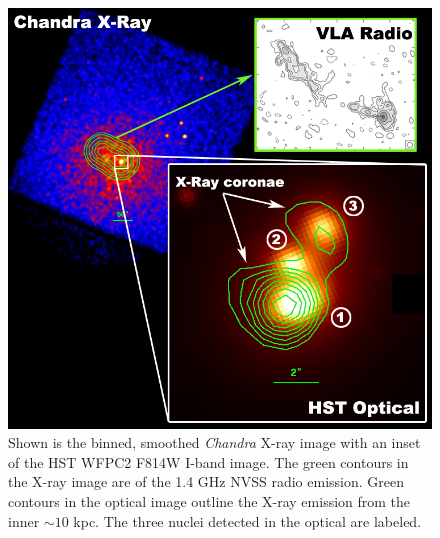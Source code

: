 \documentclass[letterpaper,11pt]{article}
\makeatletter
\renewcommand{\section}{\@startsection%
{section}{1}{0mm}{-\baselineskip}%
{0.5\baselineskip}{\normalfont\Large\bfseries}}%
\makeatother
\begin{document}
\begin{figure}[t]
\begin{minipage}[t]{0.5\linewidth}
	\includegraphics*[width=\columnwidth, trim=0mm 0mm 0mm 0mm, clip]{xr_opt}
	\caption{\small
	Shown is the binned, smoothed {\it{Chandra}} X-ray image with an inset
	of the HST WFPC2 F814W I-band image. The green contours in the X-ray
	image are of the 1.4 GHz NVSS radio emission. Green contours in the
	optical image outline the X-ray emission from the inner
	$\sim10$ kpc. The three nuclei detected in the optical are labeled.
	}
	\label{fig:hst}
    \end{minipage}
\end{figure}




\end{document}
